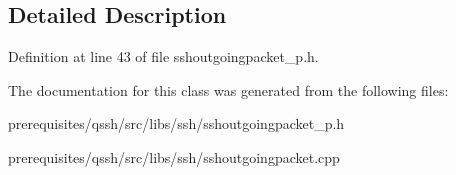 \subsection{Detailed Description}


Definition at line 43 of file sshoutgoingpacket\+\_\+p.\+h.



The documentation for this class was generated from the following files\+:\begin{DoxyCompactItemize}
\item 
prerequisites/qssh/src/libs/ssh/sshoutgoingpacket\+\_\+p.\+h\item 
prerequisites/qssh/src/libs/ssh/sshoutgoingpacket.\+cpp\end{DoxyCompactItemize}
